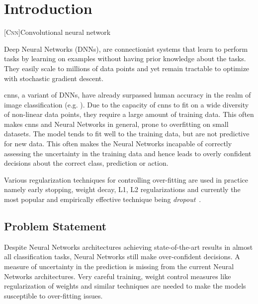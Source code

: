 \chapter{Introduction}  %

\ifpdf
    \graphicspath{{Chapter1/Figs/Raster/}{Chapter1/Figs/PDF/}{Chapter1/Figs/}}
\else
    \graphicspath{{Chapter1/Figs/Vector/}{Chapter1/Figs/}}
\fi



[\textsc{Cnn}]{Convolutional neural network}

Deep Neural Networks (DNNs), are connectionist systems that learn to perform tasks by learning on examples without having prior knowledge about the tasks. 
They easily scale to millions of data points and yet remain tractable to optimize with stochastic gradient descent.

\acp{cnn}, a variant of DNNs, have already surpassed human accuracy in the realm of image classification (e.g. \cite{he2016deep,simonyan2014very,krizhevsky2012imagenet}). Due to the capacity of \acp{cnn} to fit on a wide diversity of non-linear data points, they require a large amount of training data. This often makes \acp{cnn} and Neural Networks in general, prone to overfitting on small datasets. The model tends to fit well to the training data, but are not predictive for new data. This often makes the Neural Networks incapable of correctly assessing the uncertainty in the training data and hence leads to overly confident decisions about the correct class, prediction or action.

Various regularization techniques for controlling over-fitting are used in practice namely early stopping, weight decay, L1, L2 regularizations and currently the most popular and empirically effective technique being \emph{dropout}~\cite{hinton2012improving}. 


\section{Problem Statement}

Despite Neural Networks architectures achieving state-of-the-art results in almost all classification tasks, Neural Networks still make over-confident decisions. A measure of uncertainty in the prediction is missing from the current Neural Networks architectures. Very careful training, weight control measures like regularization of weights and similar techniques are needed to make the models susceptible to over-fitting issues. 


